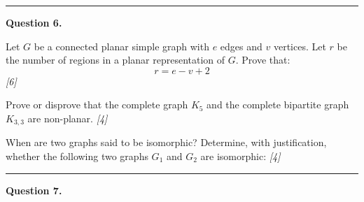 \documentclass[11pt,a4paper]{article}
\newcommand{\pts}[1]{\hfill   \textit{[#1]}}
\begin{document}
\medskip\rule{\linewidth}{0.2pt}

\medskip


\noindent   \textbf{Question 6.}

\begin{parts}
  \item Let $G$ be a connected planar simple graph with $e$ edges and $v$ vertices. Let $r$ be the number of regions in a planar representation of $G$. Prove that:
  \[ r = e - v + 2 \] \pts{6}
  \item Prove or disprove that the complete graph $K_5$ and the complete bipartite graph $K_{3,3}$ are non-planar. \pts{4}
  \item When are two graphs said to be isomorphic? Determine, with justification, whether the following two graphs $G_1$ and $G_2$ are isomorphic: \pts{4}
  
\begin{center}
    
  \end{center}
\end{parts}

\medskip\rule{\linewidth}{0.2pt}

\medskip


\noindent   \textbf{Question 7.}
\end{document}
